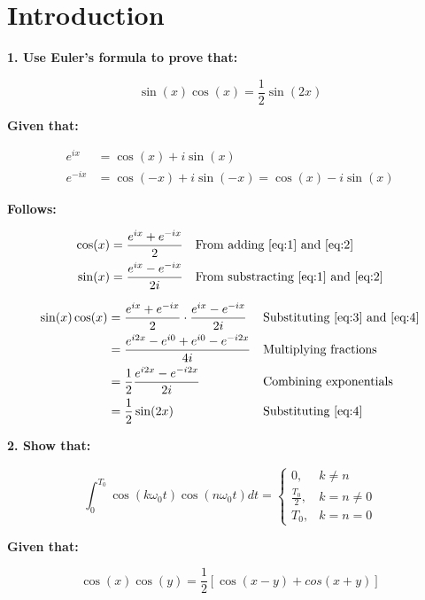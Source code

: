 \section*{Introduction}
\textbf{1. Use Euler's formula to prove that:}

\begin{equation*}
	\sin(x) \cos(x) = \frac{1}{2} \sin(2x)
\end{equation*}

\textbf{Given that:}

\begin{align}
	e^{ix} &= \cos(x) + i \sin(x) \label{eq:1}\\
	e^{-ix} &= \cos(-x) + i \sin(-x) = \cos(x) - i \sin(x) \label{eq:2}
\end{align}

\textbf{Follows:}

\begin{align*}
	\cos(x) &= \frac{e^{ix} + e^{-ix}}{2} & & \text{From adding \ref{eq:1} and \ref{eq:2}}\\
	 \sin(x) &= \frac{e^{ix} - e^{-ix}}{2i} & & \text{From substracting \ref{eq:1} and \ref{eq:2}} 
\end{align*}

\begin{align*}
	\sin(x) \cos(x) &= \frac{e^{ix} + e^{-ix}}{2} \cdot \frac{e^{ix} - e^{-ix}}{2i} & & \text{Substituting \ref{eq:3} and \ref{eq:4}}\\
	&= \frac{e^{i2x} - e^{i0} + e^{i0} - e^{-i2x}}{4i} & & \text{Multiplying fractions}\\
	&= \frac{1}{2} \frac{e^{i2x} - e^{-i2x}}{2i} & & \text{Combining exponentials}\\
	&= \frac{1}{2} \sin(2x) & & \text{Substituting \ref{eq:4}}
\end{align*}

\textbf{2. Show that:}

\begin{equation*}
	\int_0^{T_0} \cos(k \omega_0 t) \cos(n \omega_0 t) dt =
	\begin{cases}
		0,& k \neq n\\
		\frac{T_0}{2},& k = n \neq 0\\
		T_0,& k = n = 0
	\end{cases}
\end{equation*}

\textbf{Given that:}

\begin{equation}
	\cos(x) \cos(y) = \frac{1}{2} \left[ \cos(x-y) + cos(x+y) \right]
\end{equation}

